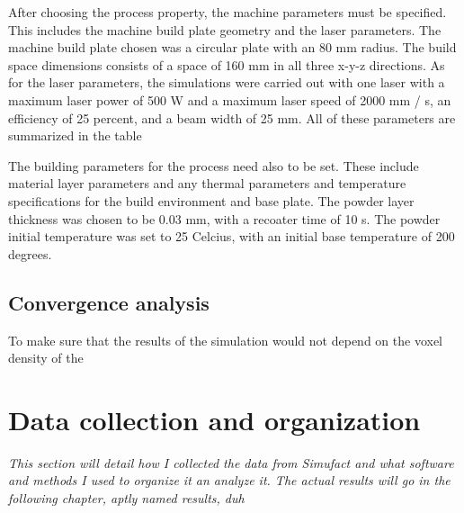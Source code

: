 \documentclass[../main.tex]{subfiles}
\begin{document}
After choosing the process property, the machine parameters must be specified. This includes the machine build plate geometry and the laser parameters. The machine build plate chosen was a circular plate with an 80 mm radius. The build space dimensions consists of a space of 160 mm in all three x-y-z directions. As for the laser parameters, the simulations were carried out with one laser with a maximum laser power of 500 W and a maximum laser speed of 2000 mm / s, an efficiency of 25 percent, and a beam width of 25 mm. All of these parameters are summarized in the table 

The building parameters for the process need also to be set. These include material layer parameters and any thermal parameters and temperature specifications for the build environment and base plate. The powder layer thickness was chosen to be 0.03 mm, with a recoater time of 10 s. The powder initial temperature was set to 25 \degree Celcius, with an initial base temperature of 200 degrees. 




\subsection{Convergence analysis}

To make sure that the results of the simulation would not depend on the voxel density of the 

\section{Data collection and organization}

\textit{This section will detail how I collected the data from Simufact and what software and methods I used to organize it an analyze it. The actual results will go in the following chapter, aptly named results, duh}

\listoftodos
\end{document}
